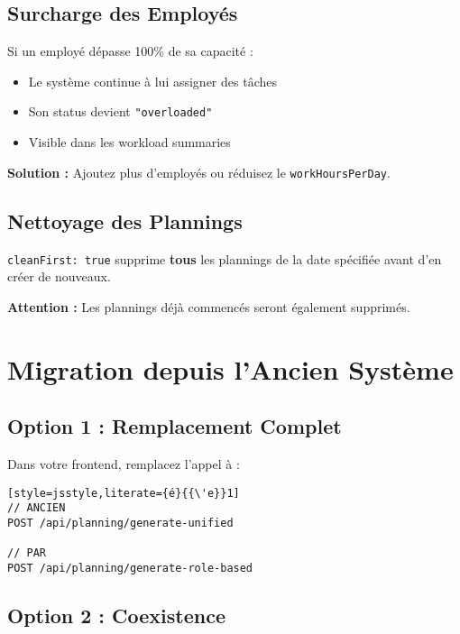 \documentclass[11pt,a4paper]{article}
\begin{document}
    \subsection{Surcharge des Employés}

    Si un employé dépasse 100\% de sa capacité :
    \begin{itemize}
        \item Le système continue à lui assigner des tâches
        \item Son status devient \texttt{"overloaded"}
        \item Visible dans les workload summaries
    \end{itemize}

    \textbf{Solution :} Ajoutez plus d'employés ou réduisez le \texttt{workHoursPerDay}.

    \subsection{Nettoyage des Plannings}

    \begin{tcolorbox}[colback=warningbox,colframe=orange!75!black,title=\textbf{Attention}]
        \texttt{cleanFirst: true} supprime \textbf{tous} les plannings de la date spécifiée avant d'en créer de nouveaux.

        \textbf{Attention :} Les plannings déjà commencés seront également supprimés.
    \end{tcolorbox}

    \section{Migration depuis l'Ancien Système}

    \subsection{Option 1 : Remplacement Complet}

    Dans votre frontend, remplacez l'appel à :

    \begin{lstlisting}[style=jsstyle,literate={é}{{\'e}}1]
// ANCIEN
POST /api/planning/generate-unified

// PAR
POST /api/planning/generate-role-based
    \end{lstlisting}

    \subsection{Option 2 : Coexistence}
\end{document}
